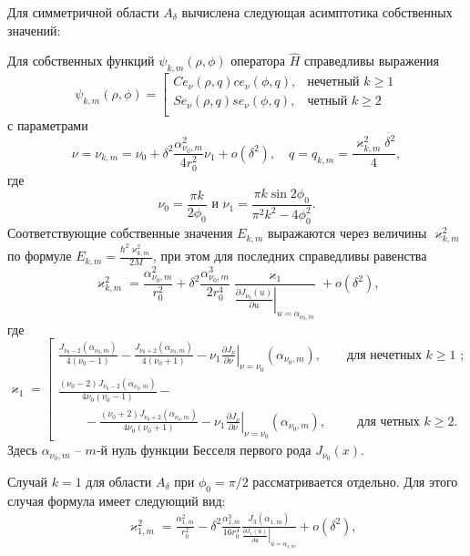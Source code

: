 Для симметричной области $A_\delta$ вычислена следующая асимптотика собственных значений:
\renewcommand{\thetheorem}{5}
\begin{theorem}
Для собственных функций $\psi_{k, m}(\rho, \phi)$ оператора   $\hat{H}$ справедливы выражения
\begin{equation}
\psi_{k, m}(\rho, \phi) = 
\left[
\begin{array}{ll}
    Ce_\nu(\rho, q) ce_\nu(\phi, q) ,   &    \text{нечетный $k \geq 1$}\\
    Se_\nu(\rho, q) se_\nu(\phi, q) ,   &    \text{четный $k \geq 2$}\\
\end{array}
\right.
\tag{2.9}
\end{equation}
с параметрами
\[
\nu = \nu_{k,m} = \nu_0+ \delta^2 \frac{\alpha_{\nu_0, m}^2}{4 r_0^2}  \nu_1 + o(\delta^2),  \quad q=q_{k,m} = \dfrac{\varkappa_{k,m}^2 \delta^2}{4},
\]
где
$$\nu_0 = \frac{\pi k}{2\phi_0}\text{\ \  и\  \  }\nu_1=\frac{\pi k \sin 2\phi_0}{\pi^2 k^2 - 4\phi_0^2}  .$$
Соответствующие собственные значения $E_{k, m}$ выражаются через величины $\varkappa^2_{k, m}$ по формуле $E_{k, m} =  \frac{\hbar^2 \varkappa^2_{k, m}}{2M}$, при этом для последних  справедливы равенства
\begin{equation}
\varkappa^2_{k, m} = \dfrac{\alpha_{\nu_0, m}^2}{r_0^2} +
\delta^2 \dfrac{\alpha_{\nu_0, m}^3}{2 r_0^4}\dfrac{\varkappa_1 }{ \left.\frac{\partial J_{\nu_0}(u)}{\partial u}\right|_{u=\alpha_{\nu_0, m}} } + o(\delta^2),
\tag{2.10}
\end{equation}
где
\begin{equation*}
    \varkappa_1 = 
    \left[
\begin{array}{ll}
\frac{J_{\nu_0-2}(\alpha_{\nu_0, m})}{4(\nu_0-1)} - \frac{J_{\nu_0+2}(\alpha_{\nu_0, m})}{4(\nu_0+1)} 
  - \nu_1 \left.\frac{\partial J_\nu}{\partial \nu}\right|_{\nu=\nu_0}(\alpha_{\nu_0, m}),\qquad \text{для нечетных $k\geq 1$ ;} \\[10pt]
\frac{(\nu_0 - 2)J_{\nu_0-2}(\alpha_{\nu_0, m})   }{4\nu_0 (\nu_0-1)} -\\
\qquad - \frac{(\nu_0 + 2)J_{\nu_0+2}(\alpha_{\nu_0, m})}{4\nu_0 (\nu_0+1)}  
- \nu_1 \left.\frac{\partial J_\nu}{\partial \nu}\right|_{\nu = \nu_0}(\alpha_{\nu_0, m}), \qquad \ \ \!    \text{для четных $k \geq 2$}.        
\end{array}
\right.
\end{equation*}
Здесь $\alpha_{\nu_0,m}$ --  $m$-й нуль функции Бесселя первого рода $J_{\nu_0}(x)$.
\end{theorem} 
Случай $k=1$ для области $A_\delta$ при $\phi_0=\pi/2$ рассматривается отдельно. Для этого случая формула имеет следующий вид:
\begin{align}
   & \varkappa_{1, m}^2 = \frac{\alpha_{1, m}^2}{r_0^2} - \delta^2 \frac{\alpha_{1, m}^3}{16r_0^4} 
    \frac{J_3(\alpha_{1, m})}{\left.\frac{\partial J_1 (u)}{\partial u}\right|_{u=\alpha_{1, m}}} 
    + o(\delta^2), 
    \tag{2.18}
    \end{align}

